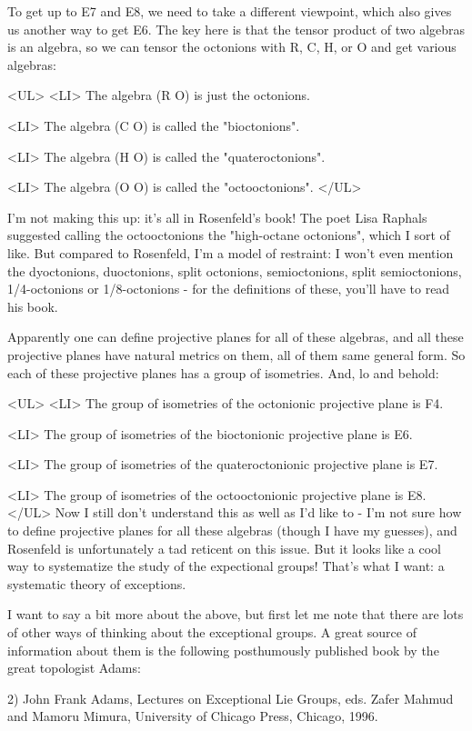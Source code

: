 To get up to E7 and E8, we need to take a different viewpoint, which
also gives us another way to get E6.  The key here is that the tensor
product of two algebras is an algebra, so we can tensor the octonions
with R, C, H, or O and get various algebras:

<UL>
<LI>
The algebra (R \otimes  O) is just the octonions.  

<LI>
The algebra (C \otimes  O) is called the "bioctonions".  

<LI>
The algebra (H \otimes  O) is called the "quateroctonions". 

<LI>
The algebra (O \otimes  O) is called the "octooctonions".
</UL>

I'm not making this up: it's all in Rosenfeld's book!  The poet Lisa
Raphals suggested calling the octooctonions the "high-octane
octonions", which I sort of like.  But compared to Rosenfeld, I'm a
model of restraint: I won't even mention the dyoctonions, duoctonions,
split octonions, semioctonions, split semioctonions, 1/4-octonions or
1/8-octonions - for the definitions of these, you'll have to read his
book.

Apparently one can define projective planes for all of these algebras,
and all these projective planes have natural metrics on them, all of
them same general form.  So each of these projective planes has a group
of isometries.  And, lo and behold:

<UL>
<LI>
The group of isometries of the octonionic projective plane is F4.

<LI>
The group of isometries of the bioctonionic projective plane is E6.

<LI>
The group of isometries of the quateroctonionic projective plane is E7.

<LI>
The group of isometries of the octooctonionic projective plane is E8.
</UL>
Now I still don't understand this as well as I'd like to - I'm not
sure how to define projective planes for all these algebras (though I
have my guesses), and Rosenfeld is unfortunately a tad reticent on
this issue.  But it looks like a cool way to systematize the study of
the expectional groups!  That's what I want: a systematic theory of
exceptions.

I want to say a bit more about the above, but first let me note that
there are lots of other ways of thinking about the exceptional groups.
A great source of information about them is the following posthumously
published book by the great topologist Adams:

2) John Frank Adams, Lectures on Exceptional Lie Groups, eds. Zafer
Mahmud and Mamoru Mimura, University of Chicago Press, Chicago, 1996.

